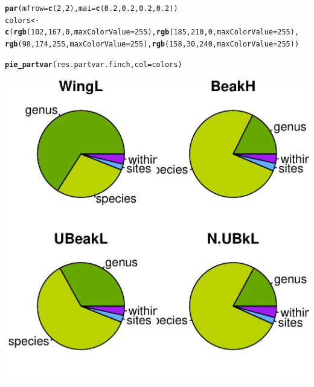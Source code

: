 \documentclass[12pt]{article}\usepackage[]{graphicx}\usepackage[]{color}
\makeatletter
\def\maxwidth{ %
  \ifdim\Gin@nat@width>\linewidth
    \linewidth
  \else
    \Gin@nat@width
  \fi
}
\newcommand{\hlnum}[1]{\textcolor[rgb]{0.686,0.059,0.569}{#1}}%
\newcommand{\hlstd}[1]{\textcolor[rgb]{0.345,0.345,0.345}{#1}}%
\newcommand{\hlkwb}[1]{\textcolor[rgb]{0.69,0.353,0.396}{#1}}%
\newcommand{\hlkwc}[1]{\textcolor[rgb]{0.333,0.667,0.333}{#1}}%
\newcommand{\hlkwd}[1]{\textcolor[rgb]{0.737,0.353,0.396}{\textbf{#1}}}%
\newenvironment{kframe}{%
 \def\at@end@of@kframe{}%
 \ifinner\ifhmode%
  \def\at@end@of@kframe{\end{minipage}}%
  \begin{minipage}{\columnwidth}%
 \fi\fi%
 \def\FrameCommand##1{\hskip\@totalleftmargin \hskip-\fboxsep
 \colorbox{shadecolor}{##1}\hskip-\fboxsep
     \hskip-\linewidth \hskip-\@totalleftmargin \hskip\columnwidth}%
 \MakeFramed {\advance\hsize-\width
   \@totalleftmargin\z@ \linewidth\hsize
   \@setminipage}}%
 {\par\unskip\endMakeFramed%
 \at@end@of@kframe}
\newenvironment{knitrout}{}{} %
\makeatother
\begin{document}
\begin{knitrout}
\color{fgcolor}\begin{kframe}
\begin{alltt}
\hlkwd{par}\hlstd{(}\hlkwc{mfrow} \hlstd{=} \hlkwd{c}\hlstd{(}\hlnum{2}\hlstd{,} \hlnum{2}\hlstd{),} \hlkwc{mai} \hlstd{=} \hlkwd{c}\hlstd{(}\hlnum{0.2}\hlstd{,} \hlnum{0.2}\hlstd{,} \hlnum{0.2}\hlstd{,} \hlnum{0.2}\hlstd{))}
\hlstd{colors} \hlkwb{<-} \hlkwd{c}\hlstd{(}\hlkwd{rgb}\hlstd{(}\hlnum{102}\hlstd{,} \hlnum{167}\hlstd{,} \hlnum{0}\hlstd{,} \hlkwc{maxColorValue} \hlstd{=} \hlnum{255}\hlstd{),} \hlkwd{rgb}\hlstd{(}\hlnum{185}\hlstd{,} \hlnum{210}\hlstd{,} \hlnum{0}\hlstd{,} \hlkwc{maxColorValue} \hlstd{=} \hlnum{255}\hlstd{),}
    \hlkwd{rgb}\hlstd{(}\hlnum{98}\hlstd{,} \hlnum{174}\hlstd{,} \hlnum{255}\hlstd{,} \hlkwc{maxColorValue} \hlstd{=} \hlnum{255}\hlstd{),} \hlkwd{rgb}\hlstd{(}\hlnum{158}\hlstd{,} \hlnum{30}\hlstd{,} \hlnum{240}\hlstd{,} \hlkwc{maxColorValue} \hlstd{=} \hlnum{255}\hlstd{))}

\hlkwd{pie_partvar}\hlstd{(res.partvar.finch,} \hlkwc{col} \hlstd{= colors)}
\end{alltt}
\end{kframe}

{\centering \includegraphics[width=\maxwidth]{figure/unnamed-chunk-161} 

}
\end{knitrout}
\end{document}
